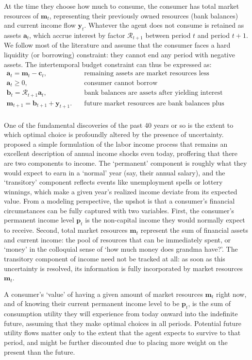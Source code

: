 \documentclass{article}
\newcommand{\cLvl}{\mathbf{c}}
\newcommand{\mLvl}{\mathbf{m}}
\newcommand{\yLvl}{\mathbf{y}}
\newcommand{\aLvl}{\mathbf{a}}
\newcommand{\Rport}{\mathcal{R}}
\newcommand{\bLvl}{\mathbf{b}}
\newcommand{\pLvl}{\mathbf{p}}
\begin{document}
At the time they choose how much to consume, the consumer has total market resources of $\mLvl_t$, representing their previously owned resources (bank balances) and current income flow $\yLvl_t$.
Whatever the agent does not consume is retained as assets $\aLvl_t$, which accrue interest by factor $\Rport_{t+1}$ between period $t$ and period $t+1$.
We follow most of the literature and assume that the consumer faces a hard liquidity (or borrowing) constraint: they cannot end any period with negative assets.
The intertemporal budget constraint can thus be expressed as:
\begin{align}
    \aLvl_t = \mLvl_t - \cLvl_t, & \text{~~~remaining assets are market resources less consumption} \\
    \aLvl_t \geq 0, & \text{~~~consumer cannot borrow} \\
    \bLvl_t = \Rport_{t+1} \aLvl_t, & \text{~~~bank balances are assets after yielding interest} \\
    \mLvl_{t+1} = \bLvl_{t+1} + \yLvl_{t+1}. & \text{~~~future market resources are bank balances plus income} \\
\end{align}

One of the fundamental discoveries of the past 40 years or so is the extent to which optimal choice is profoundly altered by the presence of uncertainty.
\cite{friedman1957} proposed a simple formulation of the labor income process that remains an excellent description of annual income shocks even today, proffering that there are two components to income.
The `permanent' component is roughly what they would expect to earn in a `normal' year (say, their annual salary), and the `transitory' component reflects events like unemployment spells or lottery winnings, which make a given year's realized income deviate from its expected value.
From a modeling perspective, the upshot is that a consumer's financial circumstances can be fully captured with two variables.
First, the consumer's permanent income level $\pLvl_{t}$ is the non-capital income they would normally expect to receive.
Second, total market resources $\mLvl_{t}$ represent the sum of financial assets and current income: the pool of resources that can be immediately spent, or `money' in the colloquial sense of `how much money does grandma have?'.
The transitory component of income need not be tracked at all: as soon as this uncertainty is resolved, its information is fully incorporated by market resources $\mLvl_{t}$.

A consumer's `value' of having a given amount of market resources $\mLvl_{t}$ right now, and of knowing their current permanent income level to be $\pLvl_{t}$, is the sum of consumption utility they will experience from today onward into the indefinite future, assuming that they make optimal choices in all periods.
Potential future utility flows matter only to the extent that the agent expects to survive to that period, and might be further discounted due to placing more weight on the present than the future.
\end{document}
